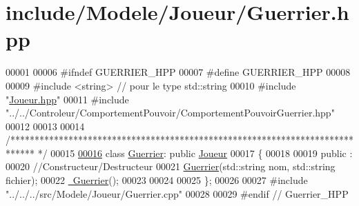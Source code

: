 \hypertarget{_guerrier_8hpp_source}{\section{include/\-Modele/\-Joueur/\-Guerrier.hpp}
}

\begin{DoxyCode}
00001 
00006 \textcolor{preprocessor}{#ifndef GUERRIER\_HPP}
00007 \textcolor{preprocessor}{}\textcolor{preprocessor}{#define GUERRIER\_HPP}
00008 \textcolor{preprocessor}{}
00009 \textcolor{preprocessor}{#include <string>} \textcolor{comment}{// pour le type std::string}
00010 \textcolor{preprocessor}{#include "\hyperlink{_joueur_8hpp}{Joueur.hpp}"}
00011 \textcolor{preprocessor}{#include "../../Controleur/ComportementPouvoir/ComportementPouvoirGuerrier.hpp"}
00012 
00013 
00014 \textcolor{comment}{/*****************************************************************************
      */}
00015 
\hypertarget{_guerrier_8hpp_source_l00016}{}\hyperlink{class_guerrier}{00016} \textcolor{keyword}{class }\hyperlink{class_guerrier}{Guerrier}: \textcolor{keyword}{public} \hyperlink{class_joueur}{Joueur}
00017 \{   
00018 
00019    \textcolor{keyword}{public} :
00020       \textcolor{comment}{//Constructeur/Destructeur}
00021       \hyperlink{class_guerrier_a08622f52e49c7fd2695ce215b3ad9aec}{Guerrier}(std::string nom, std::string fichier);
00022       \hyperlink{class_guerrier_a83ec8ec6ced25a349249d0cdc70c75b6}{~Guerrier}();
00023    
00024   
00025 \};
00026 
00027 \textcolor{preprocessor}{#include "../../../src/Modele/Joueur/Guerrier.cpp"}
00028 
00029 \textcolor{preprocessor}{#endif // Guerrier\_HPP}
\end{DoxyCode}
